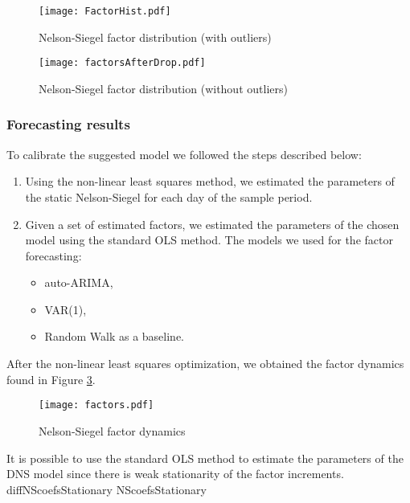             \begin{figure}
                \texttt{[image: FactorHist.pdf]}
                \caption{Nelson-Siegel factor distribution (with outliers)}
                \label{fig:NSHistOutliers}
            \end{figure}

            \begin{figure}
                \texttt{[image: factorsAfterDrop.pdf]}
                \caption{Nelson-Siegel factor distribution (without outliers)}
                \label{fig:NSHistDropped}
            \end{figure}

        \subsubsection{Forecasting results}
            To calibrate the suggested model we followed the steps described below:
            \begin{enumerate}
                \item Using the non-linear least squares method, we estimated the parameters of the static Nelson-Siegel 
                for each day of the sample period.
                \item Given a set of estimated factors, we estimated the parameters of the chosen model using the standard 
                OLS method. The models we used for the factor forecasting:
                    \begin{itemize}
                        \item auto-ARIMA,
                        \item VAR(1),
                        \item Random Walk as a baseline.
                    \end{itemize}
            \end{enumerate}

            After the non-linear least squares optimization, we obtained the factor dynamics found in Figure \ref{fig:factordynamics}.
            \begin{figure}
                \texttt{[image: factors.pdf]}
                \caption{Nelson-Siegel factor dynamics}
                \label{fig:factordynamics}
            \end{figure}

            It is possible to use the standard OLS method to estimate the parameters of the DNS model since there is 
            weak stationarity of the factor increments. 
            {diffNScoefsStationary}
            {NScoefsStationary}

